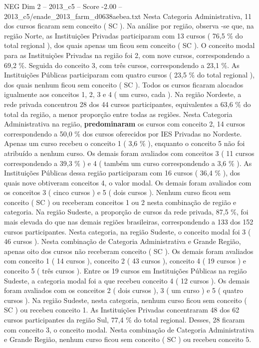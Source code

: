 \begin{textsample}{NEG Dim 2 – 2013\_c5 – Score -2.00 – 2013\_c5/enade\_2013\_farm\_d0638aebea.txt}
Nesta Categoria Administrativa, 11 dos cursos ficaram sem conceito ( SC ).
Na análise por região, observa -se que, na região Norte, as Instituições Privadas participaram com 13 cursos ( 76,5 \% do total regional ), dos quais apenas um ficou sem conceito ( SC ).
O conceito modal para as Instituições Privadas na região foi 2, com nove cursos, correspondendo a 69,2 \%.
Seguida do conceito 3, com três cursos, correspondendo a 23,1 \%.
As Instituições Públicas participaram com quatro cursos ( 23,5 \% do total regional ), dos quais nenhum ficou sem conceito ( SC ).
Todos os cursos ficaram alocados igualmente aos conceitos 1, 2, 3 e 4 ( um curso, cada ).
Na região Nordeste, a rede privada concentrou 28 dos 44 cursos participantes, equivalentes a 63,6 \% do total da região, a menor proporção entre todas as regiões.
Nesta Categoria Administrativa na região, \textbf{predominaram} os cursos com conceito 2, 14 cursos correspondendo a 50,0 \% dos cursos oferecidos por IES Privadas no Nordeste.
Apenas um curso recebeu o conceito 1 ( 3,6 \% ), enquanto o conceito 5 não foi atribuído a nenhum curso.
Os demais foram avaliados com conceitos 3 ( 11 cursos correspondendo a 39,3 \% ) e 4 ( também um curso correspondendo a 3,6 \% ).
As Instituições Públicas dessa região participaram com 16 cursos ( 36,4 \% ), dos quais nove obtiveram conceitos 4, o valor modal.
Os demais foram avaliados com os conceitos 3 ( cinco cursos ) e 5 ( dois cursos ).
Nenhum curso ficou sem conceito ( SC ) ou receberam conceitos 1 ou 2 nesta combinação de região e categoria.
Na região Sudeste, a proporção de cursos da rede privada, 87,5 \%, foi mais elevada do que nas demais regiões brasileiras, correspondendo a 133 dos 152 cursos participantes.
Nesta categoria, na região Sudeste, o conceito modal foi 3 ( 46 cursos ).
Nesta combinação de Categoria Administrativa e Grande Região, apenas oito dos cursos não receberam conceito ( SC ).
Os demais foram avaliados com conceito 1 ( 14 cursos ), conceito 2 ( 43 cursos ), conceito 4 ( 19 cursos ) e conceito 5 ( três cursos ).
Entre os 19 cursos em Instituições Públicas na região Sudeste, a categoria modal foi a que recebeu conceito 4 ( 12 cursos ).
Os demais foram avaliados com os conceitos 2 ( dois cursos ), 3 ( um curso ) e 5 ( quatro cursos ).
Na região Sudeste, nesta categoria, nenhum curso ficou sem conceito ( SC ) ou recebeu conceito 1.
As Instituições Privadas concentraram 48 dos 62 cursos participantes da região Sul, 77,4 \% do total regional.
Desses, 28 ficaram com conceito 3, o conceito modal.
Nesta combinação de Categoria Administrativa e Grande Região, nenhum curso ficou sem conceito ( SC ) ou recebeu conceito 5.

\end{textsample}
